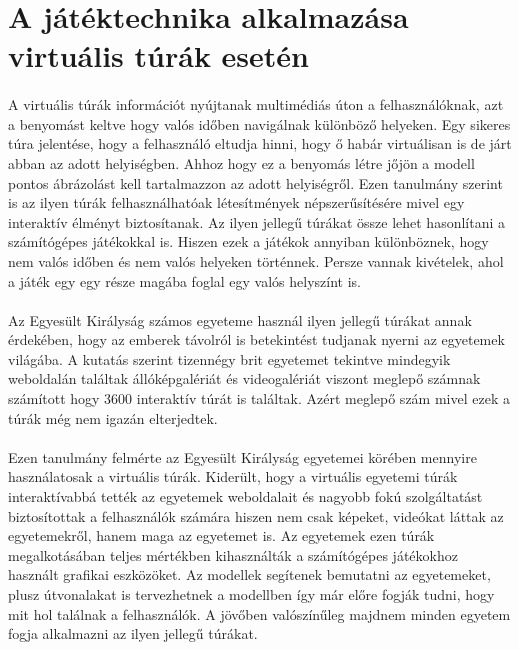 \section{A játéktechnika alkalmazása virtuális túrák esetén}
\paragraph{}
A virtuális túrák információt nyújtanak multimédiás úton a felhasználóknak, azt a benyomást keltve hogy valós időben navigálnak különböző helyeken. Egy sikeres túra jelentése, hogy a felhasználó eltudja hinni, hogy ő habár virtuálisan is de járt abban az adott helyiségben. Ahhoz hogy ez a benyomás létre jőjön a modell pontos ábrázolást kell tartalmazzon az adott helyiségről. Ezen tanulmány szerint is az ilyen túrák felhasználhatóak létesítmények népszerűsítésére mivel egy interaktív élményt biztosítanak. Az ilyen jellegű túrákat össze lehet hasonlítani a számítógépes játékokkal is. Hiszen ezek a játékok annyiban különböznek, hogy nem valós időben és nem valós helyeken történnek. Persze vannak kivételek, ahol a játék egy egy része magába foglal egy valós helyszínt is. 
\paragraph{}
Az Egyesült Királyság \cite{maines2015application} számos egyeteme használ ilyen jellegű túrákat annak érdekében, hogy az emberek távolról is betekintést tudjanak nyerni az egyetemek világába. A kutatás szerint tizennégy brit egyetemet tekintve mindegyik weboldalán találtak állóképgalériát és videogalériát viszont meglepő számnak számított hogy 3600 interaktív túrát is találtak. Azért meglepő szám mivel ezek a túrák még nem igazán elterjedtek.
\paragraph{}
Ezen tanulmány felmérte az Egyesült Királyság egyetemei körében mennyire használatosak a virtuális túrák. Kiderült, hogy a virtuális egyetemi túrák interaktívabbá tették az egyetemek weboldalait és nagyobb fokú szolgáltatást biztosítottak a felhasználók számára hiszen nem csak képeket, videókat láttak az egyetemekről, hanem maga az egyetemet is. Az egyetemek ezen túrák megalkotásában teljes mértékben kihasználták  a számítógépes játékokhoz használt grafikai eszközöket. Az modellek segítenek bemutatni az egyetemeket, plusz útvonalakat is tervezhetnek a modellben így már előre fogják tudni, hogy mit hol találnak a felhasználók. A jövőben valószínűleg majdnem minden egyetem fogja alkalmazni az ilyen jellegű túrákat.
